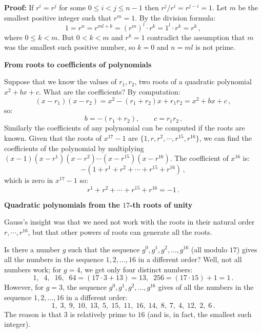 \documentclass[a4paper,11pt]{article}
\begin{document}
\textbf{Proof:} If $r^i=r^j$ for some $0\leq i<j\leq n-1$ then $r^j/r^i=r^{j-i}=1$. Let $m$ be the smallest positive integer such that $r^{m}=1$. By the division formula:
\[
1=r^n=r^{ml+k}=(r^m)^l\cdot r^k=1^l\cdot r^k=r^k\,,
\]
where $0\leq k<m$. But $0<k<m$ and $r^k=1$ contradict the assumption that $m$ was the smallest such positive number, so $k=0$ and $n=ml$ is not prime.

\textbf{From roots to coefficients of polynomials}

Suppose that we know the values of $r_1,r_2$, two roots of a quadratic polynomial $x^2+bx+c$. What are the coefficients? By computation:
\[
(x-r_1)(x-r_2)=x^2 - (r_1+r_2)x + r_1r_2=x^2+bx+c\,,
\]
so:
\begin{equation}\label{eq.v1}
b=-(r_1+r_2), \qquad c=r_1r_2\,.
\end{equation}
Similarly the coefficients of any polynomial can be computed if the roots are known. Given that the roots of $x^{17}-1$ are $\{1,r,r^2,\cdots, r^{15}, r^{16}\}$, we can find the coefficients of the polynomial by multiplying $(x-1)(x-r^1)(x-r^2)\cdots (x-r^{15})(x-r^{16})$. The coefficient of $x^{16}$ is:
\[
-(1+r^1+r^2+\cdots+r^{15}+r^{16})\,,
\]
which is zero in $x^{17}-1$ so:
\begin{equation}\label{eq.sum-is-minus1}
r^1+r^2+\cdots+r^{15}+r^{16}=-1\,.
\end{equation}

\textbf{Quadratic polynomials from the $17$-th roots of unity}

Gauss's insight was that we need not work with the roots in their natural order $r,\cdots,r^{16}$, but that other powers of roots can generate all the roots.

Is there a number $g$ such that the sequence $g^0,g^1,g^2,\ldots, g^{16}$ (all modulo $17$) gives all the numbers in the sequence $1,2,\ldots,16$ in a different order? Well, not all numbers work; for $g=4$, we get only four distinct numbers:
\[
1,\;\; 4,\;\; 16,\;\; 64=(17\cdot 3 +13)= 13,\;\; 256=(17\cdot 15)+1=1\,.
\]
However, for $g=3$, the sequence $g^0,g^1,g^2,\ldots, g^{16}$ gives of all the numbers in the sequence $1,2,\ldots,16$ in a different order:
\[
1,\; 3,\; 9,\; 10,\; 13,\; 5,\; 15,\; 11,\; 16,\; 14,\; 8,\; 7,\; 4,\; 12,\; 2,\; 6\,.
\]
The reason is that $3$ is relatively prime to $16$ (and is, in fact, the smallest such integer).
\end{document}
